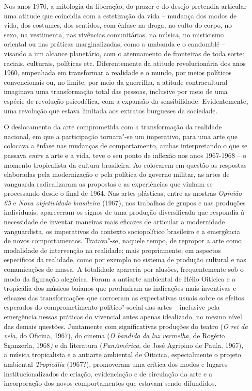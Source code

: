 Nos anos 1970, a mitologia da liberação, do prazer e do desejo pretendia
articular uma atitude que coincidia com a estetização da vida -- mudança
dos modos de vida, dos costumes, dos sentidos, com ênfase na droga, no
culto do corpo, no sexo, na vestimenta, nas vivências comunitárias, na
música, no misticismo oriental ou nas práticas marginalizadas, como a
umbanda e o candomblé -- visando a um alcance planetário, com o
atenuamento de fronteiras de toda sorte: raciais, culturais, políticas
etc. Diferentemente da atitude revolucionária dos anos 1960, empenhada
em transformar a realidade e o mundo, por meios políticos convencionais
ou, no limite, por meio da guerrilha, a atitude contracultural imaginava
uma transformação total das pessoas, inclusive por meio de uma espécie
de revolução psicodélica, com a expansão da sensibilidade.
Evidentemente, uma revolução que estava limitada aos extratos burgueses
da sociedade.

O deslocamento da arte comprometida com a transformação da realidade
nacional, em que a participação tornara"-se um imperativo, para uma arte
que colocava a ênfase nas mudanças de comportamento, ambas interpretando
o que se passava \emph{entre} a arte e a vida, teve o seu ponto de
inflexão nos anos 1967-1968 -- o momento tropicalista da cultura
brasileira. Ao colocarem em questão as respostas elaboradas pela
modernização e pela política do governo militar, as artes de vanguarda
radicalizaram as propostas e as experiências que vinham se processando
desde o final de 1964. Nas artes plásticas, entre as mostras
\emph{Opinião 65} e \emph{Nova objetividade brasileira} (1967), nos
trabalhos de grupos e nas produções individuais, apareceram os signos de
uma produção diversificada que respondia à necessidade de inventar
maneiras mais eficazes de articular a modernidade vanguardista, os
imperativos do contexto sociopolítico brasileiro e a emergência de novos
comportamentos. Tratava"-se, naquele tempo, de repropor a arte como
modalidade de intervenção na realidade; mais propriamente, em aspectos
específicos da realidade, como por exemplo no sistema de produção
cultural e nas comunicações de massa. A totalidade aparecia por alusões,
frequentemente sob o modo da figuração alegórica. Foram a antiarte
ambiental de Hélio Oiticica e a tropicália dos músicos baianos que
produziram as indicações mais inventivas e eficazes das transformações
que corroeram as expectativas usuais sobre os efeitos esperados do
comprometimento político"-social das artes -- inclusive pela emergência
nessas práticas do vivencial antes apenas idealizado, no mesmo nível das
demais questões. Juntamente com significativas produções do teatro
(\emph{O rei da vela,} do Oficina, 1967), do cinema (\emph{O bandido da
luz vermelha,} de Rogério Sganzerla, 1968\emph{)} e da literatura
(\emph{PanAmérica,} de José Agripino de Paula, 1967), a música
tropicalista e a antiarte ambiental de Oiticica, especialmente o projeto
ambiental \emph{Tropicália} (1967?), promoveram uma crítica dos modos e
lugares institucionalizados de criação, evidenciação e de circulação da
arte e a incorporação dos novos comportamentos que estavam sendo
difundidos.

